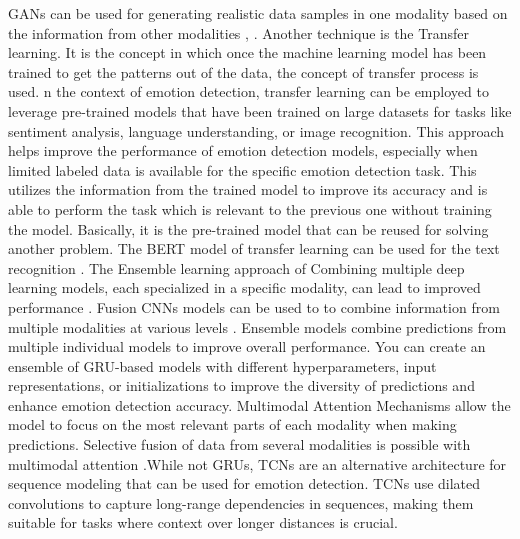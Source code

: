 \documentclass[conference]{IEEEtran}
\begin{document}
GANs can be used for generating realistic data samples in one modality based on the information from other modalities \cite{vidal2023multimodal}, \cite{luo2019gan}. 
Another technique is the Transfer learning. It is the concept in which once the machine learning model has been trained to get the patterns out of the data, the concept of transfer process is used. n the context of emotion detection, transfer learning can be employed to leverage pre-trained models that have been trained on large datasets for tasks like sentiment analysis, language understanding, or image recognition. This approach helps improve the performance of emotion detection models, especially when limited labeled data is available for the specific emotion detection task. This utilizes the information from the trained model to improve its accuracy and is able to perform the task which is relevant to the previous one without training the model. Basically, it is the pre-trained model that can be reused for solving another problem. The BERT model of transfer learning can be used for the text recognition \cite{padi2022multimodal}. 
The Ensemble learning approach of Combining multiple deep learning models, each specialized in a specific modality, can lead to improved performance \cite{salama20213d}. 
Fusion CNNs models can be used to  to combine information from multiple modalities at various levels \cite{zhang2021multimodal}.  Ensemble models combine predictions from multiple individual models to improve overall performance. You can create an ensemble of GRU-based models with different hyperparameters, input representations, or initializations to improve the diversity of predictions and enhance emotion detection accuracy.
Multimodal Attention Mechanisms allow the model to focus on the most relevant parts of each modality when making predictions. Selective fusion of data from several modalities is possible with multimodal attention \cite{zhang2023multimodal}.While not GRUs, TCNs are an alternative architecture for sequence modeling that can be used for emotion detection. TCNs use dilated convolutions to capture long-range dependencies in sequences, making them suitable for tasks where context over longer distances is crucial.
\end{document}
